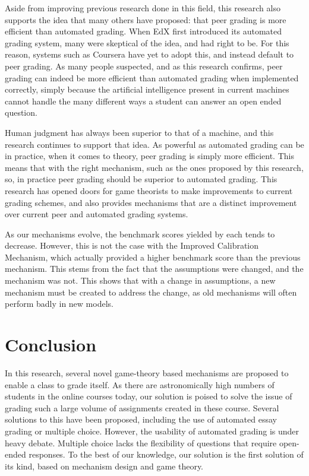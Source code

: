 \documentclass[12pt, Arial]{article}
\begin{document}
Aside from improving previous research done in this field, this research also supports the idea that many others have proposed: that peer grading is more efficient than automated grading. When EdX first introduced its automated grading system, many were skeptical of the idea, and had right to be. For this reason, systems such as Coursera have yet to adopt this, and instead default to peer grading. As many people suspected, and as this research confirms, peer grading can indeed be more efficient than automated grading when implemented correctly, simply because the artificial intelligence present in current machines cannot handle the many different ways a student can answer an open ended question.

Human judgment has always been superior to that of a machine, and this research continues to support that idea. As powerful as automated grading can be in practice, when it comes to theory, peer grading is simply more efficient. This means that with the right mechanism, such as the ones proposed by this research, so, in practice peer grading should be superior to automated grading. This research has opened doors for game theorists to make improvements to current grading schemes, and also provides mechanisms that are a distinct improvement over current peer and automated grading systems.

As our mechanisms evolve, the benchmark scores yielded by each tends to decrease. However, this is not the case with the Improved Calibration Mechanism, which actually provided a higher benchmark score than the previous mechanism. This stems from the fact that the assumptions were changed, and the mechanism was not. This shows that with a change in assumptions, a new mechanism must be created to address the change, as old mechanisms will often perform badly in new models.

\section{Conclusion}

In this research, several novel game-theory based mechanisms are proposed to enable a class to grade itself. As there are astronomically high numbers of students in the online courses today, our solution is poised to solve the issue of grading such a large volume of assignments created in these course. Several solutions to this have been proposed, including the use of automated essay grading or multiple choice. However, the usability of automated grading is under heavy debate. Multiple choice lacks the flexibility of questions that require open-ended responses. To the best of our knowledge, our solution is the first solution of its kind, based on mechanism design and game theory.
\end{document}
